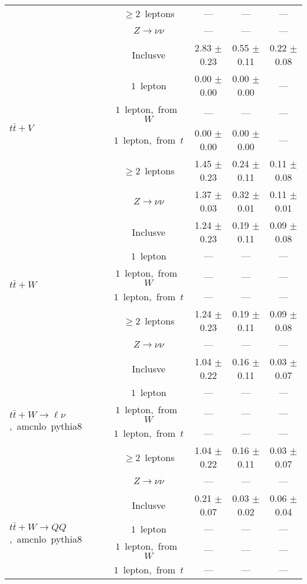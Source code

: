 \documentclass{article}
\begin{document}
\begin{longtable}{|l|c|c|c|c|}
 & $\ge2$~leptons  & ---  & ---  & --- \\* 
 & $Z\rightarrow\nu\nu$  & ---  & ---  & --- \\* 
\hline 
\multirow{6}{*}{$t\bar{t}+V$} & Inclusve  & 2.83 $\pm$ 0.23  & 0.55 $\pm$ 0.11  & 0.22 $\pm$ 0.08 \\* 
 & $1$~lepton  & 0.00 $\pm$ 0.00  & 0.00 $\pm$ 0.00  & --- \\* 
 & $1$~lepton,~from~$W$  & ---  & ---  & --- \\* 
 & $1$~lepton,~from~$t$  & 0.00 $\pm$ 0.00  & 0.00 $\pm$ 0.00  & --- \\* 
 & $\ge2$~leptons  & 1.45 $\pm$ 0.23  & 0.24 $\pm$ 0.11  & 0.11 $\pm$ 0.08 \\* 
 & $Z\rightarrow\nu\nu$  & 1.37 $\pm$ 0.03  & 0.32 $\pm$ 0.01  & 0.11 $\pm$ 0.01 \\* 
\hline 
\multirow{6}{*}{$t\bar{t}+W$} & Inclusve  & 1.24 $\pm$ 0.23  & 0.19 $\pm$ 0.11  & 0.09 $\pm$ 0.08 \\* 
 & $1$~lepton  & ---  & ---  & --- \\* 
 & $1$~lepton,~from~$W$  & ---  & ---  & --- \\* 
 & $1$~lepton,~from~$t$  & ---  & ---  & --- \\* 
 & $\ge2$~leptons  & 1.24 $\pm$ 0.23  & 0.19 $\pm$ 0.11  & 0.09 $\pm$ 0.08 \\* 
 & $Z\rightarrow\nu\nu$  & ---  & ---  & --- \\* 
\hline 
\multirow{6}{*}{$t\bar{t}+W{\rightarrow}{\ell}{\nu}$,~amcnlo~pythia8} & Inclusve  & 1.04 $\pm$ 0.22  & 0.16 $\pm$ 0.11  & 0.03 $\pm$ 0.07 \\* 
 & $1$~lepton  & ---  & ---  & --- \\* 
 & $1$~lepton,~from~$W$  & ---  & ---  & --- \\* 
 & $1$~lepton,~from~$t$  & ---  & ---  & --- \\* 
 & $\ge2$~leptons  & 1.04 $\pm$ 0.22  & 0.16 $\pm$ 0.11  & 0.03 $\pm$ 0.07 \\* 
 & $Z\rightarrow\nu\nu$  & ---  & ---  & --- \\* 
\hline 
\multirow{6}{*}{$t\bar{t}+W{\rightarrow}QQ$,~amcnlo~pythia8} & Inclusve  & 0.21 $\pm$ 0.07  & 0.03 $\pm$ 0.02  & 0.06 $\pm$ 0.04 \\* 
 & $1$~lepton  & ---  & ---  & --- \\* 
 & $1$~lepton,~from~$W$  & ---  & ---  & --- \\* 
 & $1$~lepton,~from~$t$  & ---  & ---  & --- \\* 

\end{longtable}
\end{document}
